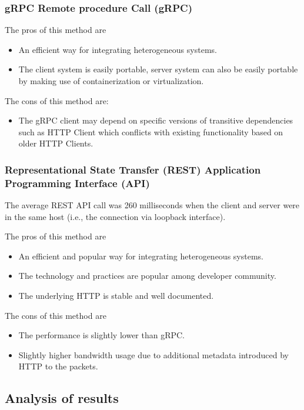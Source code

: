 \subsubsection{gRPC Remote procedure Call (gRPC)} \label{sec:eval-rpc}

The pros of this method are
\begin{itemize}
\item An efficient way for integrating heterogeneous systems.
\item The client system is easily portable, server system can also be easily portable by making use of containerization or virtualization.
\end{itemize}

The cons of this method are:
\begin{itemize}
  \item The gRPC client may depend on specific versions of transitive dependencies such as HTTP Client which conflicts with existing functionality based on older HTTP Clients.
\end{itemize}

\subsubsection{Representational State Transfer (REST) Application Programming Interface (API)} \label{sec:eval-rest}

The average REST API call was 260 milliseconds when the client and server were in the same host (i.e., the connection via loopback interface).

The pros of this method are
\begin{itemize}
\item An efficient and popular way for integrating heterogeneous systems.
\item The technology and practices are popular among developer community.
\item The underlying HTTP is stable and well documented.
\end{itemize}

The cons of this method are
\begin{itemize}
\item The performance is slightly lower than gRPC.
\item Slightly higher bandwidth usage due to additional metadata introduced by HTTP to the packets.
\end{itemize}

\subsection{Analysis of results}

